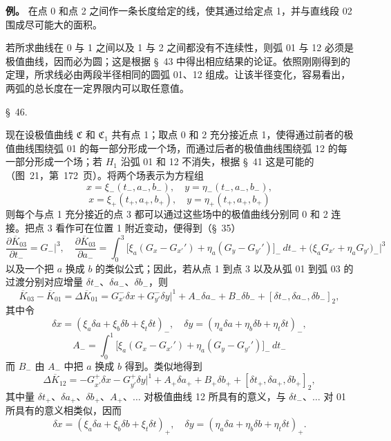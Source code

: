 \documentclass[11pt,a4paper,leqno]{article}
\begin{document}
\textbf{例。} 在点 0 和点 2 之间作一条长度给定的线，使其通过给定点 1，并与直线段 02 围成尽可能大的面积。

若所求曲线在 0 与 1 之间以及 1 与 2 之间都没有不连续性，则弧 01 与 12 必须是极值曲线，因而必为圆；这是根据 \S~43 中得出相应结果的论证。依照刚刚得到的定理，所求线必由两段半径相同的圆弧 01、12 组成。让该半径变化，容易看出，两弧的总长度在一定界限内可以取任意值。

\begin{center}
{\large \S~46.}
\end{center}

现在设极值曲线 $\mathfrak{C}$ 和 $\mathfrak{C}_1$ 共有点 1；取点 0 和 2 充分接近点 1，使得通过前者的极值曲线围绕弧 01 的每一部分形成一个场，而通过后者的极值曲线围绕弧 12 的每一部分形成一个场；若 $H_1$ 沿弧 01 和 12 不消失，根据 \S~41 这是可能的（图~21，第~172~页）。将两个场表示为方程组
\[
 x=\xi_-(t_-,a_-,b_-),\quad y=\eta_-(t_-,a_-,b_-),
\]
\[
 x=\xi_+(t_+,a_+,b_+),\quad y=\eta_+(t_+,a_+,b_+)
\]
则每个与点 1 充分接近的点 3 都可以通过这些场中的极值曲线分别同 0 和 2 连接。把点 3 看作可在位置 1 附近变动，便得到（\S~35）
\begin{equation}\tag{10}
\frac{\partial\overline K_{03}}{\partial t_-}=G_-\bigg|^3,
\quad
\frac{\partial\overline K_{03}}{\partial a_-}
=\int_0^3\bigl[\xi_a(G_x-G_{x'}')+\eta_a(G_y-G_{y'}')\bigr]_-\,dt_-
+\bigl(\xi_aG_{x'}+\eta_aG_{y'}\bigr)_-\bigg|^3
\end{equation}
以及一个把 $a$ 换成 $b$ 的类似公式；因此，若从点 1 到点 3 以及从弧 01 到弧 03 的过渡分别对应增量 $\delta t_-$、$\delta a_-$、$\delta b_-$，则
\[
\overline K_{03}-\overline K_{01}=\Delta\overline K_{01}
=G_{x'}^-\delta x+G_{y'}^-\delta y\bigg|^1
+A_-\delta a_-+B_-\delta b_-+[\delta t_-,\delta a_-,\delta b_-]_2,
\]
其中令
\begin{equation}\tag{11}
\delta x=(\xi_a\delta a+\xi_b\delta b+\xi_t\delta t)_-,
\quad
\delta y=(\eta_a\delta a+\eta_b\delta b+\eta_t\delta t)_-,
\end{equation}
\[
A_- =\int_0^1\bigl[\xi_a(G_x-G_{x'}')+\eta_a(G_y-G_{y'}')\bigr]_-\,dt_-
\]
而 $B_-$ 由 $A_-$ 中把 $a$ 换成 $b$ 得到。类似地得到
\[
\Delta\overline K_{12}
=-G_{x'}^+\delta x-G_{y'}^+\delta y\bigg|^1
+A_+\delta a_+ +B_+\delta b_+ +[\delta t_+,\delta a_+,\delta b_+]_2,
\]
其中量 $\delta t_+$、$\delta a_+$、$\delta b_+$、$A_+$、$\ldots$ 对极值曲线 12 所具有的意义，与 $\delta t_-$、$\ldots$ 对 01 所具有的意义相类似，因而
\begin{equation}\tag{12}
\delta x=(\xi_a\delta a+\xi_b\delta b+\xi_t\delta t)_+,
\quad
\delta y=(\eta_a\delta a+\eta_b\delta b+\eta_t\delta t)_+.
\end{equation}
\end{document}
